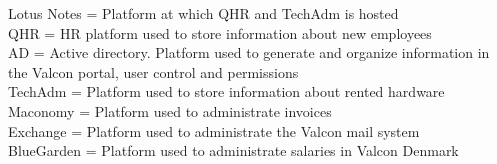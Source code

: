 Lotus Notes		=	Platform at which QHR and TechAdm is hosted	\\
QHR				=	HR platform used to store information about new employees	\\
AD				=	Active directory. Platform used to generate and organize information in the Valcon portal, user control and permissions	\\
TechAdm			=	Platform used to store information about rented hardware	\\
Maconomy		=	Platform used to administrate invoices	\\
Exchange		=	Platform used to administrate the Valcon mail system	\\
BlueGarden		=	Platform used to administrate salaries in Valcon Denmark	\\